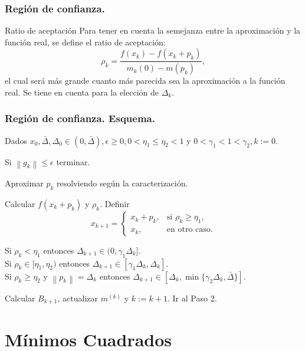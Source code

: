 \documentclass{beamer}
\newcommand{\norm}[1]{\left\lVert#1\right\rVert}
\begin{document}
\begin{frame}
    \frametitle{Región de confianza.}
    \begin{block}{Ratio de aceptación}
        Para tener en cuenta la semejanza entre la aproximación y la función real, se define el ratio de aceptación:
        \begin{equation*}
            \rho_k = \frac{f(x_k) - f(x_k + p_k)}{m_k(0) - m(p_k)},
        \end{equation*}
        el cual será más grande cuanto más parecida sea la aproximación a la función real. Se tiene en cuenta para la elección de $\Delta_k$.
    \end{block}
\end{frame}

\begin{frame}
    \frametitle{Región de confianza. Esquema.}
    \begin{steps}
		\item Dados $x_0, \bar{\Delta}, \Delta_0 \in (0, \bar{\Delta}), \epsilon \geq
			0, 0<\eta_1\leq\eta_2<1$ y $0<\gamma_1<1<\gamma_2, k:=0$.
		\item Si $\norm{g_k} \leq \epsilon$ terminar.
		\item Aproximar $p_k$ resolviendo según la caracterización.
		\item Calcular $f(x_k+p_k)$ y $\rho_k$. Definir
			\begin{equation*}
				x_{k+1} = \begin{cases}
					x_k + p_k, & \text{si } \rho_k \geq \eta_1, \\
					x_k, & \text{en otro caso.}
				\end{cases}
			\end{equation*}
		\item Si $\rho_k < \eta_1$ entonces $\Delta_{k+1} \in (0,\gamma_1 \Delta_k]$. \\
			Si $\rho_k \in [\eta_1, \eta_2)$ entonces $\Delta_{k+1} \in [\gamma_1 \Delta_k,\Delta_k]$. \\
			Si $\rho_k \geq \eta_2$ y $\norm{p_k}=\Delta_k$ entonces
			$\Delta_{k+1} \in [\Delta_k, \min \{\gamma_2 \Delta_k,\bar{\Delta}\}]$.
		\item Calcular $B_{k+1}$, actualizar $m^{(k)}$ y $k:=k+1$. Ir al Paso 2.
	\end{steps}
\end{frame}

\section{Mínimos Cuadrados}
\end{document}
